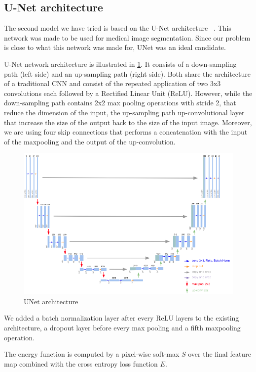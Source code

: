 \documentclass[10pt,conference,compsocconf]{IEEEtran}
\begin{document}
\subsection{U-Net architecture}
The second model we have tried is based on the U-Net architecture ~\cite{unet}. This network was made to be used for medical image segmentation. Since our problem is close to what this network was made for, UNet was an ideal candidate.

U-Net network architecture is illustrated in \ref{fig:unet}. It consists of a down-sampling path (left side) and an up-sampling path (right side). Both share the architecture of a traditional CNN and consist of the repeated application of two 3x3 convolutions each followed by a Rectified Linear Unit (ReLU). However, while the down-sampling path contains 2x2 max pooling operations with stride 2, that reduce the dimension of the input, the up-sampling path up-convolutional layer that increase the size of the output back to the size of the input image. Moreover, we are using four skip connections that performs a concatenation with the input of the maxpooling and the output of the up-convolution.

\begin{figure}[h]
  \centering
  \includegraphics[width=0.95\columnwidth]{img/unet.png}
  \caption{UNet architecture}
  \label{fig:unet}
\end{figure}

We added a batch normalization layer after every ReLU layers to the existing architecture, a dropout layer before every max pooling and a fifth maxpooling operation.

The energy function is computed by a pixel-wise soft-max $S$ over the final feature map combined with the cross entropy loss function $E$.
\end{document}
